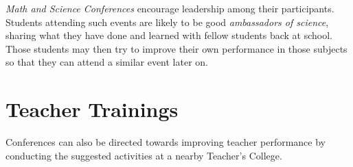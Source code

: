 \emph{Math and Science Conferences} encourage leadership among their participants. Students attending such events are likely to be good \emph{ambassadors of science}, sharing what they have done and learned with fellow students back at school. Those students may then try to improve their own performance in those subjects so that they can attend a similar event later on.

\section{Teacher Trainings} 

Conferences can also be directed towards improving teacher performance by conducting the suggested activities at a nearby Teacher's College. 